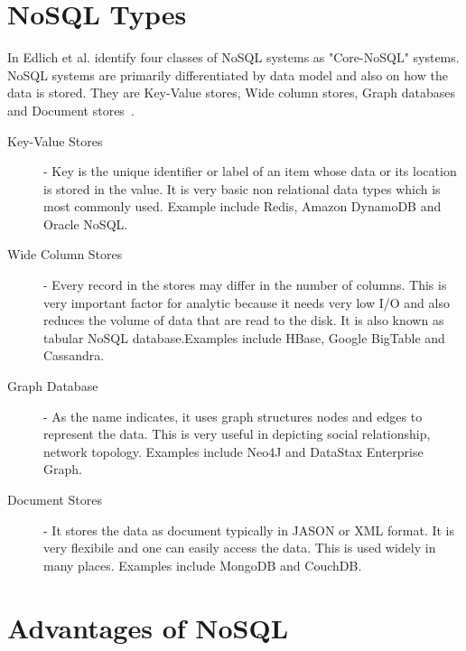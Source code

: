\section{NoSQL Types}

In Edlich et al. identify four classes of NoSQL systems 
as "Core-NoSQL" systems. NoSQL systems are primarily differentiated
by data model and also on how the data is stored. They are 
Key-Value stores, Wide column stores, Graph databases and
Document stores~\cite{hid-sp18-710-edmodel}.

\begin{description}

\item[Key-Value Stores] - Key is the unique identifier or label of
an item whose data or its location is stored in the value. 
It is very basic non relational data types which is most 
commonly used. Example include Redis, Amazon DynamoDB 
and Oracle NoSQL. 

\item[Wide Column Stores] - Every record in the stores may
differ in the number of columns. This is very important factor 
for analytic because it needs very low I/O and also reduces the
volume of data that are read to the disk. It is also known as 
tabular NoSQL database.Examples include HBase, 
Google BigTable and Cassandra.

\item[Graph Database] - As the name indicates, it uses graph
structures nodes and edges to represent the data. This is very 
useful in depicting social relationship, network topology. 
Examples include Neo4J and DataStax Enterprise Graph. 

\item[Document Stores] - It stores the data as document typically
in JASON or XML format. It is very flexibile and one can easily
access the data. This is used widely in many places.
Examples include MongoDB and CouchDB.
\end{description}

\section{Advantages of NoSQL}

